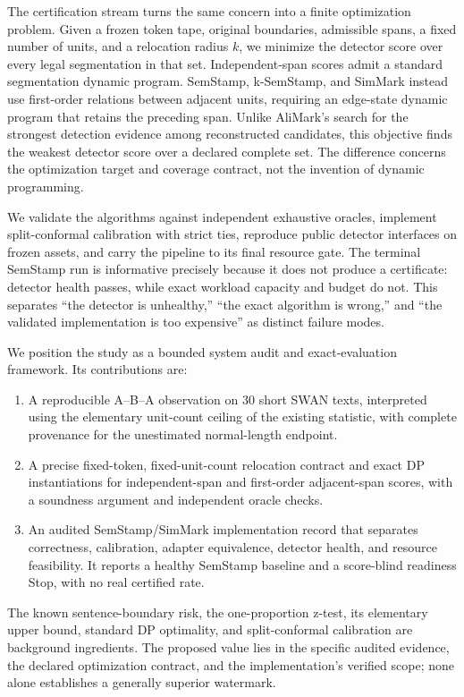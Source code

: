 \documentclass[10pt]{article}
\begin{document}
The certification stream turns the same concern into a finite optimization
problem. Given a frozen token tape, original boundaries, admissible spans, a
fixed number of units, and a relocation radius $k$, we minimize the detector
score over every legal segmentation in that set. Independent-span scores
admit a standard segmentation dynamic program. SemStamp, k-SemStamp, and
SimMark instead use first-order relations between adjacent units, requiring
an edge-state dynamic program that retains the preceding span.
Unlike AliMark's search for the strongest detection evidence among
reconstructed candidates, this objective finds the weakest detector score
over a declared complete set. The difference concerns the optimization
target and coverage contract, not the invention of dynamic programming.

We validate the algorithms against independent exhaustive oracles, implement
split-conformal calibration with strict ties, reproduce public detector
interfaces on frozen assets, and carry the pipeline to its final resource
gate. The terminal SemStamp run is informative precisely because it does not
produce a certificate: detector health passes, while exact workload capacity
and budget do not. This separates ``the detector is unhealthy,'' ``the exact
algorithm is wrong,'' and ``the validated implementation is too expensive''
as distinct failure modes.

We position the study as a bounded system audit and exact-evaluation
framework. Its contributions are:

\begin{enumerate}
  \item A reproducible A--B--A observation on 30 short SWAN texts, interpreted
  using the elementary unit-count ceiling of the existing statistic, with
  complete provenance for the unestimated normal-length endpoint.
  \item A precise fixed-token, fixed-unit-count relocation contract and
  exact DP instantiations for independent-span and first-order adjacent-span
  scores, with a soundness argument and independent oracle checks.
  \item An audited SemStamp/SimMark implementation record that separates
  correctness, calibration, adapter equivalence, detector health, and
  resource feasibility. It reports a healthy SemStamp baseline and a
  score-blind readiness Stop, with no real certified rate.
\end{enumerate}

The known sentence-boundary risk, the one-proportion z-test, its elementary
upper bound, standard DP optimality, and split-conformal calibration are
background ingredients. The proposed value lies in the specific audited
evidence, the declared optimization contract, and the implementation's
verified scope; none alone establishes a generally superior watermark.
\end{document}
